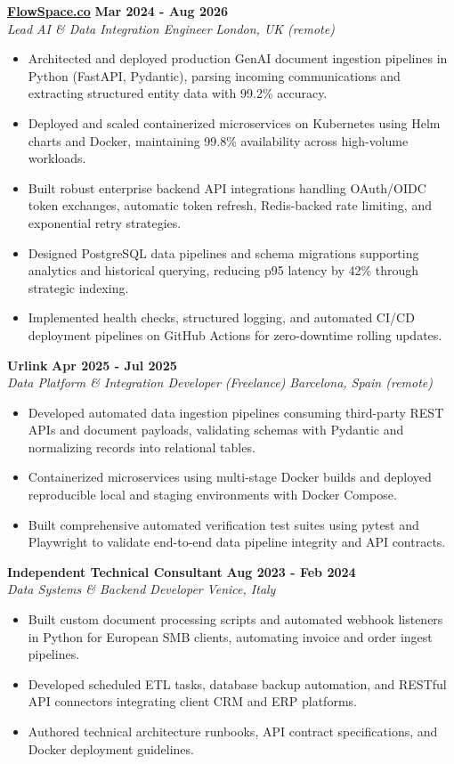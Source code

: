 \documentclass[10pt,a4paper]{article}
\newcommand{\role}[4]{%
  \textbf{#1} \hfill \textbf{#2}\\[1pt]%
  \textit{#3} \hfill \textit{#4}\\[2pt]%
}
\begin{document}
\role{\href{https://flowspace.co}{FlowSpace.co}}{Mar 2024 - Aug 2026}{Lead AI \& Data Integration Engineer}{London, UK (remote)}
\begin{itemize}
  \item Architected and deployed production GenAI document ingestion pipelines in Python (FastAPI, Pydantic), parsing incoming communications and extracting structured entity data with 99.2\% accuracy.
  \item Deployed and scaled containerized microservices on Kubernetes using Helm charts and Docker, maintaining 99.8\% availability across high-volume workloads.
  \item Built robust enterprise backend API integrations handling OAuth/OIDC token exchanges, automatic token refresh, Redis-backed rate limiting, and exponential retry strategies.
  \item Designed PostgreSQL data pipelines and schema migrations supporting analytics and historical querying, reducing p95 latency by 42\% through strategic indexing.
  \item Implemented health checks, structured logging, and automated CI/CD deployment pipelines on GitHub Actions for zero-downtime rolling updates.
\end{itemize}

\role{Urlink}{Apr 2025 - Jul 2025}{Data Platform \& Integration Developer (Freelance)}{Barcelona, Spain (remote)}
\begin{itemize}
  \item Developed automated data ingestion pipelines consuming third-party REST APIs and document payloads, validating schemas with Pydantic and normalizing records into relational tables.
  \item Containerized microservices using multi-stage Docker builds and deployed reproducible local and staging environments with Docker Compose.
  \item Built comprehensive automated verification test suites using pytest and Playwright to validate end-to-end data pipeline integrity and API contracts.
\end{itemize}

\role{Independent Technical Consultant}{Aug 2023 - Feb 2024}{Data Systems \& Backend Developer}{Venice, Italy}
\begin{itemize}
  \item Built custom document processing scripts and automated webhook listeners in Python for European SMB clients, automating invoice and order ingest pipelines.
  \item Developed scheduled ETL tasks, database backup automation, and RESTful API connectors integrating client CRM and ERP platforms.
  \item Authored technical architecture runbooks, API contract specifications, and Docker deployment guidelines.
\end{itemize}
\end{document}
